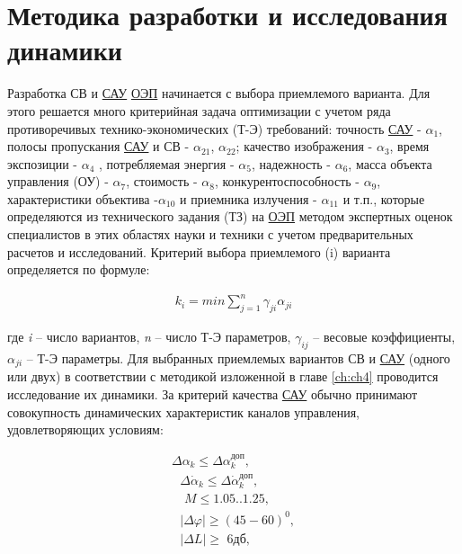 \section{Методика разработки и исследования динамики} \label{sec:ch2/sec1-}


Разработка СВ и \hyperref[acroSAU]{САУ} \hyperref[acroEOS]{ОЭП} начинается с выбора приемлемого варианта. Для этого решается много критерийная задача оптимизации с учетом ряда противоречивых технико-экономических (Т-Э) требований: точность \hyperref[acroSAU]{САУ} -  $\alpha_{1}$, полосы пропускания \hyperref[acroSAU]{САУ} и СВ - $\alpha_{21}$, $\alpha_{22}$; качество изображения -  $\alpha_{3}$, время экспозиции -  $\alpha_{4}$ , потребляемая энергия -  $\alpha_{5}$, надежность -  $\alpha_{6}$, масса объекта управления (ОУ) -  $\alpha_{7}$, стоимость -  $\alpha_{8}$, конкурентоспособность - $\alpha_{9}$, характеристики объектива -$\alpha_{10}$ и приемника излучения - $\alpha_{11}$ и т.п., которые определяются из технического задания (ТЗ) на \hyperref[acroEOS]{ОЭП} методом экспертных оценок специалистов в этих областях науки и техники с учетом предварительных расчетов и исследований. Критерий выбора приемлемого (i) варианта определяется по формуле:

\begin{equation}
\label{eq:p2:1}
\begin{alignedat}{2}
k_i=min\sum_{j=1}^n{\gamma _{ji}\alpha _{ji}}
\end{alignedat}
\end{equation}

где \textit{i} – число вариантов, \textit{n} – число Т-Э параметров, $\gamma_{ij}$ – весовые коэффициенты, $\alpha_{ji}$ – Т-Э параметры. Для выбранных приемлемых вариантов  СВ и \hyperref[acroSAU]{САУ} (одного или двух) в соответствии с методикой изложенной в главе \ref{ch:ch4} проводится исследование их динамики. За критерий качества \hyperref[acroSAU]{САУ} обычно принимают совокупность динамических характеристик каналов управления, удовлетворяющих условиям:

\begin{equation}
\label{eq:p2:2}
\begin{alignedat}{2}
\varDelta \alpha _k\leqslant \varDelta \alpha _{k}^{\textit{доп}},
\\
\,\,\,\,\varDelta \dot{\alpha}_k\leqslant \varDelta \dot{\alpha}_{k}^{\textit{доп}},
\\
\,\,\,\,\,\,M\leqslant \text{1.05..1.25,}
\\
\,\,\,\,\left| \left. \varDelta \varphi \right| \right. \geqslant \left( 45-60 \right) ^0,
\\
\,\,\,\,\left| \left. \varDelta L \right|\geqslant \,\,\textit{6дб}, \right. 
\end{alignedat}
\end{equation}


